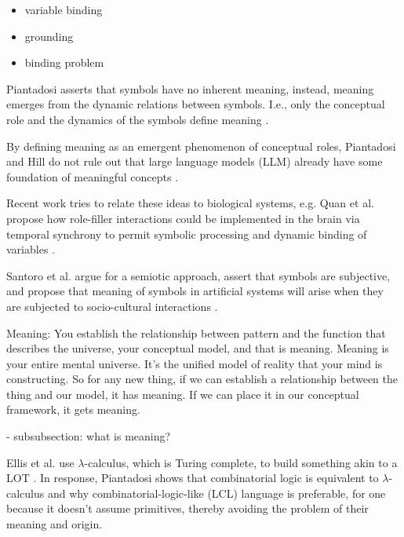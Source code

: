 \begin{itemize}
    \item variable binding
    \item grounding
    \item binding problem
\end{itemize}

Piantadosi asserts that symbols have no inherent meaning, instead, meaning emerges from the dynamic relations between symbols. I.e., only the conceptual role and the dynamics of the symbols define meaning \cite{piantadosi2021computational}.

By defining meaning as an emergent phenomenon of conceptual roles, Piantadosi and Hill do not rule out that large language models (LLM) already have some foundation of meaningful concepts \cite{piantasodi2022meaning}.

Recent work tries to relate these ideas to biological systems, e.g. Quan et al. propose how role-filler interactions could be implemented in the brain via temporal synchrony to permit symbolic processing and dynamic binding of variables \cite{do2021neural}.

Santoro et al. argue for a semiotic approach, assert that symbols are subjective, and propose that meaning of symbols in artificial systems will arise when they are subjected to socio-cultural interactions \cite{santoro2021symbolic}.





Meaning: You establish the relationship between pattern and the function that describes the universe, your conceptual model, and that is meaning. Meaning is your entire mental universe. It's the unified model of reality that your mind is constructing. So for any new thing, if we can establish a relationship between the thing and our model, it has meaning. If we can place it in our conceptual framework, it gets meaning. 

- subsubsection: what is meaning?






Ellis et al. use $\lambda$-calculus, which is Turing complete, to build something akin to a LOT \cite{ellis_dreamcoder_2021}. In response, Piantadosi shows that combinatorial logic is equivalent to $\lambda$-calculus and why combinatorial-logic-like (LCL) language is preferable, for one because it doesn't assume primitives, thereby avoiding the problem of their meaning and origin.

